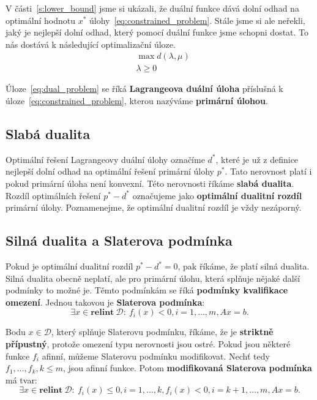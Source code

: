 V části~\ref{s:lower_bound} jsme si ukázali, že duální funkce dává dolní odhad na optimální hodnotu $x^*$ úlohy~\ref{eq:constrained_problem}. Stále jsme si ale neřekli, jaký je nejlepší dolní odhad, který pomocí duální funkce jsme schopni dostat. To nás dostává k následující optimalizační úloze.
\begin{equation}\label{eq:dual_problem}
    \begin{split}
        &\max d(\lambda, \mu) \\
        &\lambda \geq 0
    \end{split}
\end{equation}

Úloze~\ref{eq:dual_problem} se říká \textbf{Lagrangeova duální úloha} příslušná k úloze~\ref{eq:constrained_problem}, kterou nazýváme \textbf{primární úlohou}.

\subsection{Slabá dualita}

Optimální řešení Lagrangeovy duální úlohy označíme $d^*$, které je už z definice nejlepší dolní odhad na optimální řešení primární úlohy $p^*$. Tato nerovnost platí i pokud primární úloha není konvexní. Této nerovnosti říkáme \textbf{slabá dualita}. Rozdíl optimálních řešení $p^* - d^*$ označujeme jako \textbf{optimální dualitní rozdíl} primární úlohy. Poznamenejme, že optimální dualitní rozdíl je vždy nezáporný.


\subsection{Silná dualita a Slaterova podmínka}

Pokud je optimální dualitní rozdíl $p^* - d^* = 0$, pak říkáme, že platí silná dualita. Silná dualita obecně neplatí, ale pro primární úlohu, která splňuje nějaké další podmínky to možné je. Těmto podmínkám se říká \textbf{podmínky kvalifikace omezení}. Jednou takovou je \textbf{Slaterova podmínka}:
$$
    \exists x \in \textbf{relint}\ \mathcal{D}:\ f_i(x) < 0, i = 1, \dots, m, Ax = b.
$$

Bodu $x \in \mathcal{D}$, který splňuje Slaterovu podmínku, říkáme, že je \textbf{striktně přípustný}, protože omezení typu nerovnosti jsou ostré. Pokud jsou některé funkce $f_i$ afinní, můžeme Slaterovu podmínku modifikovat. Nechť tedy $f_1, \dots, f_k, k \leq m$, jsou afinní funkce. Potom \textbf{modifikovaná Slaterova podmínka} má tvar:
$$
    \exists x \in \textbf{relint}\ \mathcal{D}:\ f_i(x) \leq 0, i = 1, \dots, k, f_i(x) < 0, i = k+1, \dots, m, Ax = b.
$$

